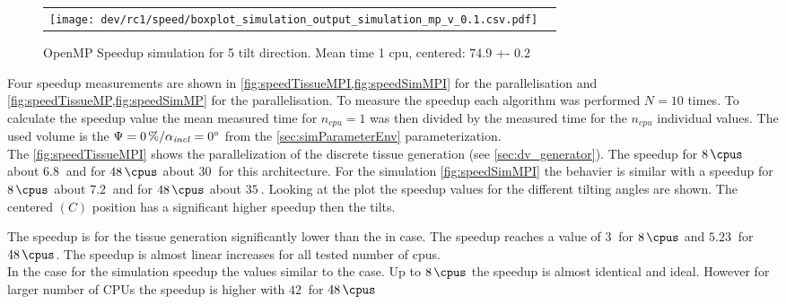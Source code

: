 % 
\begin{figure}[!t]
\centering
% 
\begin{lrbox}{\newtable}
\end{lrbox}
% 
\begin{tabular}{cc}
\begin{minipage}{0.6\textwidth}
\texttt{[image: dev/rc1/speed/boxplot\_simulation\_output\_simulation\_mp\_v\_0.1.csv.pdf]}
\end{minipage}
&
\begin{minipage}{0.25\textwidth}
\usebox{\newtable}
\end{minipage}
\end{tabular}
\caption[]{OpenMP Speedup simulation for 5 tilt direction. Mean time 1 cpu, centered: 74.9 +- 0.2}
\label{fig:speedSimMP}
\end{figure}
% 
Four speedup measurements are shown in \cref{fig:speedTissueMPI,fig:speedSimMPI} for the \mpi{} parallelisation and \cref{fig:speedTissueMP,fig:speedSimMP} for the \openmp{} parallelisation.
To measure the speedup each algorithm was performed $N=10$ times.
To calculate the speedup value the mean measured time for $n_\mathit{cpu}=1$ was then divided by the measured time for the $n_\mathit{cpu}$ individual values.
The used volume is the $\textnormal{$\Psi$}=\SI{0}{\percent} / \textnormal{$\alpha_{\mathit{incl}}$}=\SI{0}{\degree}$ from the \cref{sec:simParameterEnv} parameterization.
\\
% 
The \cref{fig:speedTissueMPI} shows the parallelization of the discrete tissue generation (see \cref{sec:dv_generator}).
The speedup for $\SI{8}{\cpus}$ about $\SI{6.8}{}$ and for $\SI{48}{\cpus}$ about $\SI{30}{}$ for this architecture.
For the simulation \cref{fig:speedSimMPI} the behavier is similar with a speedup for $\SI{8}{\cpus}$ about $\SI{7.2}{}$ and for $\SI{48}{\cpus}$ about $\SI{35}{}$.
Looking at the plot the speedup values for the different tilting angles are shown.
The centered $(C)$ position has a significant higher speedup then the tilts.
\par
% 
The \openmp{} speedup is for the tissue generation significantly lower than the in \mpi{} case.
The speedup reaches a value of $\SI{3}{}$ for $\SI{8}{\cpus}$ and $\SI{5.23}{}$ for $\SI{48}{\cpus}$.
The speedup is almost linear increases for all tested number of cpus.
\\
% 
In the case for the simulation speedup the values similar to the \mpi{} case.
Up to $\SI{8}{\cpus}$ the speedup is almost identical and ideal.
However for larger number of CPUs the speedup is higher with $\SI{42}{}$ for $\SI{48}{\cpus}$
% 
% 
